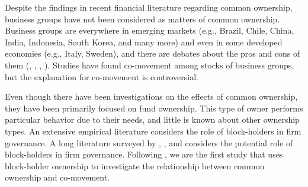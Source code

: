 \documentclass[12pt, a4paper]{article}
\begin{document}
	
	
	
	
Despite the findings in recent financial literature regarding common ownership, business groups have not been considered as matters of common ownership. Business groups are everywhere in emerging markets (e.g., Brazil, Chile, China, India, Indonesia, South Korea, and many more) and even in some developed economies (e.g., Italy, Sweden), and there are debates about the pros and cons of them (\cite{khanna2000group}, \cite{khanna2007business}, \cite{Johnson2000}, \cite{Bertrand2002}). Studies have found co-movement among stocks of business groups, but the explanation for co-movement is controversial.
	
Even though there have been investigations on the effects of common ownership, they have been primarily focused on fund ownership. This type of owner performs particular behavior due to their needs, and little is known about other ownership types. An extensive empirical literature considers the role of block-holders in firm governance. A long literature surveyed by \cite{holderness2003survey}, \cite{edmans2014blockholders}, and \cite{edmans2017blockholders} considers the potential role of block-holders in firm governance. Following \cite{AntonPolk}, we are the first study that uses block-holder ownership to investigate the relationship between common ownership and co-movement.
			
			
			
		
\end{document}
